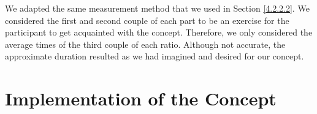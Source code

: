 We adapted the same measurement method that we used in Section \ref{4.2.2.2}. We considered the first and second couple of each part to be an exercise for the participant to get acquainted with the concept. Therefore, we only considered the average times of the third couple of each ratio. Although not accurate, the approximate duration resulted as we had imagined and desired for our concept.

\section{Implementation of the Concept} \label{4.3}



